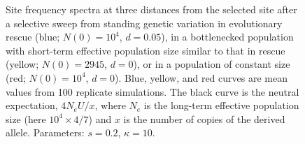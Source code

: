 \documentclass[]{article}
\begin{document}
\begin{figure}[htbp]
\centering
{}
\caption{
Site frequency spectra at three distances from the selected site after a selective sweep from standing genetic variation in evolutionary rescue (blue; $N(0)=10^4$, $d=0.05$), in a bottlenecked population with short-term effective population size similar to that in rescue (yellow; $N(0)=2945$, $d=0$), or in a population of constant size (red; $N(0)=10^4$, $d=0$).
Blue, yellow, and red curves are mean values from 100 replicate simulations.
The black curve is the neutral expectation, $4 N_e U / x$, where $N_e$ is the long-term effective population size (here $10^4\times 4/7$) and $x$ is the number of copies of the derived allele.
Parameters: $s=0.2$, $\kappa=10$. 
}%
\label{fig:rescueSGV_SFS}
\end{figure}
\end{document}
